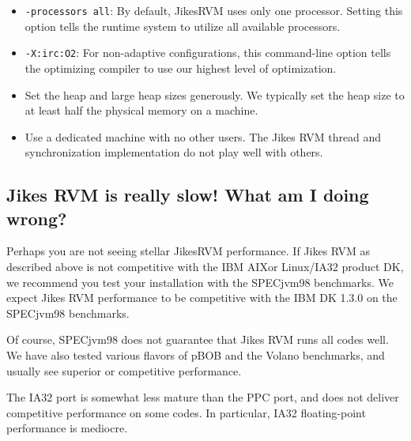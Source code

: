 \begin{itemize}
\item {\tt -processors all}: By default, Jikes\trademark RVM uses only
one processor.  Setting this option tells the runtime system to
utilize all available processors. 
\item {\tt -X:irc:O2}: For non-adaptive configurations, this command-line option tells the optimizing compiler to use our highest level of optimization.
\item Set the heap and large heap sizes generously.  We typically set the heap size to at least half the physical memory on a machine.
\item Use a dedicated machine with no other users.  The Jikes RVM thread and synchronization implementation do not play well with others.
\end{itemize}

\JikesTMFooter

\subsection{Jikes RVM is really slow! What am I doing wrong?}

Perhaps you are not seeing stellar Jikes\trademark RVM performance.
If Jikes RVM as 
described above is not competitive with the IBM AIX\AIXTMFootnote or
Linux/IA32 product DK, we recommend you test your installation with
the SPECjvm98 benchmarks.  We expect Jikes RVM performance to be competitive
with the IBM DK 1.3.0 on the SPECjvm98 benchmarks.

Of course, SPECjvm98 does not guarantee that Jikes RVM runs all codes
well.  We have also tested various flavors of pBOB and the Volano
benchmarks, and usually see superior or competitive performance.

The IA32 port is somewhat less mature than the PPC port, and does not
deliver competitive performance on some codes.  In particular, IA32
floating-point performance is mediocre.

